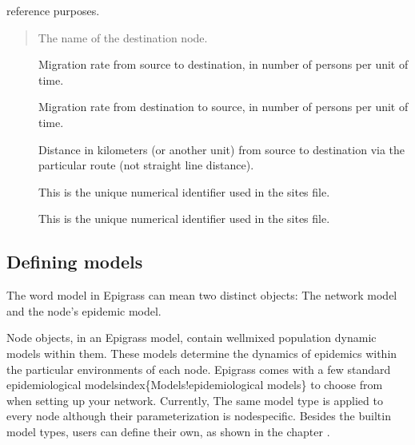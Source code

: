 \documentclass[letterpaper,10pt,english]{sphinxmanual}
\begin{document}
reference purposes.
\begin{quote}

The name of the destination node.
\end{quote}
\begin{description}
\item[{}] \leavevmode
Migration rate from source to destination, in number of persons per unit of time.

\item[{}] \leavevmode
Migration rate from destination to source, in number of persons per unit of time.

\item[{}] \leavevmode
Distance in kilometers (or another unit) from source to destination via the particular route (not straight line distance).

\item[{}] \leavevmode
This is the unique numerical identifier used in the sites file.

\item[{}] \leavevmode
This is the unique numerical identifier used in the sites file.

\end{description}

\ignorespaces 

\subsection{Defining models}
\label{\detokenize{overview:defining-models}}\label{\detokenize{overview:index-3}}
The word model in Epigrass can mean two distinct objects: The network model and the node’s epidemic model.

Node objects, in an Epigrass model, contain well\sphinxhyphen{}mixed population dynamic models within them. These models determine
the dynamics of epidemics within the particular environments of each node. Epigrass comes with a few standard
epidemiological modelsindex\{Models!epidemiological models\} to choose from when setting up your network. Currently,
The same model type is applied to every node although their parameterization is node\sphinxhyphen{}specific. Besides the built\sphinxhyphen{}in
model types, users can define their own, as shown in the chapter .
\end{document}
